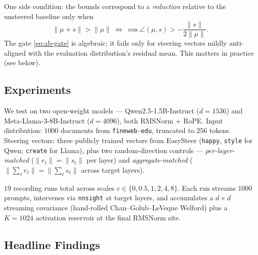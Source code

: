 One side condition: the bounds correspond to a \emph{reduction} relative
to the unsteered baseline only when
\begin{equation}
  \|\mu + s\| > \|\mu\| \;\iff\; \cos\angle(\mu, s) > -\frac{\|s\|}{2\|\mu\|}.
  \label{eq:ab-gate}
\end{equation}
The gate \eqref{eq:ab-gate} is algebraic; it fails only for steering
vectors mildly anti-aligned with the evaluation distribution's residual
mean. This matters in practice (see below).

\subsection{Experiments}

We test on two open-weight models --- Qwen2.5-1.5B-Instruct ($d=1536$)
and Meta-Llama-3-8B-Instruct ($d=4096$), both RMSNorm + RoPE. Input
distribution: $1000$ documents from \texttt{fineweb-edu}, truncated to
$256$ tokens. Steering vectors: three publicly trained vectors from
EasySteer (\texttt{happy}, \texttt{style} for Qwen; \texttt{create} for
Llama), plus two random-direction controls --- \emph{per-layer-matched}
($\|r_\ell\| = \|s_\ell\|$ per layer) and \emph{aggregate-matched}
($\|\sum_\ell r_\ell\| = \|\sum_\ell s_\ell\|$ across target layers).

$19$ recording runs total across scales $c \in \{0, 0.5, 1, 2, 4, 8\}$.
Each run streams $1000$ prompts, intervenes via \texttt{nnsight} at
target layers, and accumulates a $d \times d$ streaming covariance
(hand-rolled Chan--Golub--LeVeque Welford) plus a $K = 1024$ activation
reservoir at the final RMSNorm site.

\subsection{Headline Findings}


